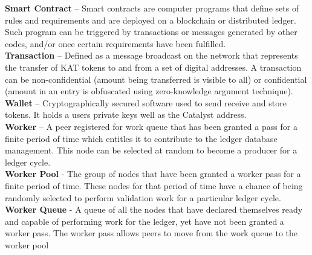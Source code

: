 \textbf{Smart Contract} – Smart contracts are computer programs that define sets of rules and requirements and are deployed on a blockchain or distributed ledger. Such program can be triggered by transactions or messages generated by other codes, and/or once certain requirements have been fulfilled. \\

\textbf{Transaction} – Defined as a message broadcast on the network that represents the transfer of KAT tokens to and from a set of digital addresses. A transaction can be non-confidential (amount being transferred is visible to all) or confidential (amount in an entry is obfuscated using zero-knowledge argument technique). \\

\textbf{Wallet} – Cryptographically secured software used to send receive and store tokens. It holds a users private keys well as the Catalyst address.\\

\textbf{Worker} – A peer registered for work queue that has been granted a pass for a finite period of time which entitles it to contribute to the ledger database management. This node can be selected at random to become a producer for a ledger cycle. \\

\textbf{Worker Pool} - The group of nodes that have been granted a worker pass for a finite period of time. These nodes for that period of time have a chance of being randomly selected to perform validation work for a particular ledger cycle. \\

\textbf{Worker Queue} - A queue of all the nodes that have declared themselves ready and capable of performing work for the ledger, yet have not been granted a worker pass. The worker pass allows peers to move from the work queue to the worker pool\\

